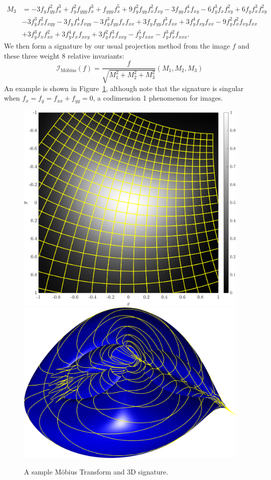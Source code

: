 \documentclass[review,onefignum,onetabnum]{siamonline190516}
\begin{document}
\begin{align*}
M_3&=-3 f_y  f_{yy}^2 f_x ^3 + 
 f_y ^2 f_{yyy} f_x ^3 + f_{yyy} f_x ^5 + 
 9 f_y ^2 f_{yy} f_x ^2 f_{xy} - 
 3 f_{yy} f_x ^4 f_{xy} - 6 f_y ^3 f_x  f_{xy}^2 + 
 6 f_y  f_x ^3 f_{xy}^2 \\ \nonumber
&- 3 f_y ^3 f_x ^2 f_{xyy} - 
 3 f_y  f_x ^4 f_{xyy} - 3 f_y ^3 f_{yy} f_x  f_{xx} + 
 3 f_y  f_{yy} f_x ^3 f_{xx} + 3 f_y ^4 f_{xy} f_{xx} - 
 9 f_y ^2 f_x ^2 f_{xy} f_{xx} \\ \nonumber
 &+ 3 f_y ^3 f_x  f_{xx}^2 + 3 f_y ^4 f_x  f_{xxy} + 
 3 f_y ^2 f_x ^3 f_{xxy} - f_y ^5 f_{xxx} - 
 f_y ^3 f_x ^2 f_{xxx}.
\end{align*}
We then form a signature by our usual projection method from the image $f$
and these three weight $8$ relative invariants:
\begin{equation}
    \label{eq:mobiussignature}
    \mathcal{I}_{\text{M\"obius}}(f) = \frac{f}{\sqrt{M_1^2 + M_2^2 +
    M_3^2}} (M_1, M_2, M_3)
\end{equation}
An example is shown in Figure~\ref{fig:mobius}, although note that the
signature is singular when $f_x=f_y=f_{xx}+f_{yy}=0$, a codimension 1
phenomenon for images. 
\begin{figure}
\centering
\includegraphics[width=.45\textwidth]{Figs/f_transformed_Mobius.png}
\includegraphics[width=.45\textwidth]{Figs/Mobius_signature.png}
\caption{A sample M\"obius Transform and 3D signature.}
\label{fig:mobius}
\end{figure}

\end{document}
